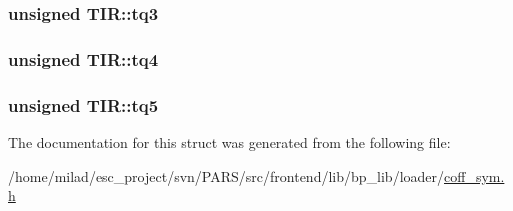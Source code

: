 \label{structTIR_a4ffe0f8d8f19acd1643350c2a7e21e95}
\hypertarget{structTIR_a4dd400d0019e055a1da486ee4aa72200}{
\subsubsection[{tq3}]{\setlength{\rightskip}{0pt plus 5cm}unsigned {\bf TIR::tq3}}}
\label{structTIR_a4dd400d0019e055a1da486ee4aa72200}
\hypertarget{structTIR_a7d0bbdc22424c97b19a7b31bd032df33}{
\subsubsection[{tq4}]{\setlength{\rightskip}{0pt plus 5cm}unsigned {\bf TIR::tq4}}}
\label{structTIR_a7d0bbdc22424c97b19a7b31bd032df33}
\hypertarget{structTIR_a339261bf84849dee1a8e64b31c6e6991}{
\subsubsection[{tq5}]{\setlength{\rightskip}{0pt plus 5cm}unsigned {\bf TIR::tq5}}}
\label{structTIR_a339261bf84849dee1a8e64b31c6e6991}


The documentation for this struct was generated from the following file:\begin{DoxyCompactItemize}
\item 
/home/milad/esc\_\-project/svn/PARS/src/frontend/lib/bp\_\-lib/loader/\hyperlink{coff__sym_8h}{coff\_\-sym.h}\end{DoxyCompactItemize}
